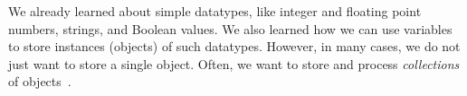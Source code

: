 %
%
We already learned about simple datatypes, like integer and floating point numbers, strings, and Boolean values.
We also learned how we can use variables to store instances (objects) of such datatypes.
However, in many cases, we do not just want to store a single object.
Often, we want to store and process \emph{collections} of objects~\cite{PSF2024BIT,PSF2024DM,PSF2024CAABCFC}.%
%
%
%
%
%
\endhsection%
%
